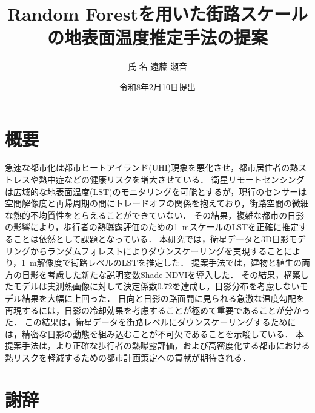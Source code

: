\documentclass[12pt,epsf]{jreport}
\begin{document}
\title{Random Forestを用いた街路スケールの地表面温度推定手法の提案}
\author{氏 名 遠藤 瀬音}
\date{令和8年2月10日提出}
\maketitle

\setcounter{page}{1}
\chapter*{概要}



急速な都市化は都市ヒートアイランド(UHI)現象を悪化させ，都市居住者の熱ストレスや熱中症などの健康リスクを増大させている．
衛星リモートセンシングは広域的な地表面温度(LST)のモニタリングを可能とするが，現行のセンサーは空間解像度と再帰周期の間にトレードオフの関係を抱えており，街路空間の微細な熱的不均質性をとらえることができていない．
その結果，複雑な都市の日影の影響により，歩行者の熱曝露評価のための1~mスケールのLSTを正確に推定することは依然として課題となっている．
本研究では，衛星データと3D日影モデリングからランダムフォレストによりダウンスケーリングを実現することにより，1~m解像度で街路レベルのLSTを推定した．
提案手法では，建物と植生の両方の日影を考慮した新たな説明変数Shade NDVIを導入した．
その結果，構築したモデルは実測熱画像に対して決定係数0.72を達成し，日影分布を考慮しないモデル結果を大幅に上回った．
日向と日影の路面間に見られる急激な温度勾配を再現するには，日影の冷却効果を考慮することが極めて重要であることが分かった．
この結果は，衛星データを街路レベルにダウンスケーリングするためには，精密な日影の動態を組み込むことが不可欠であることを示唆している．
本提案手法は，より正確な歩行者の熱曝露評価，および高密度化する都市における熱リスクを軽減するための都市計画策定への貢献が期待される．




\chapter*{謝辞}
\end{document}

